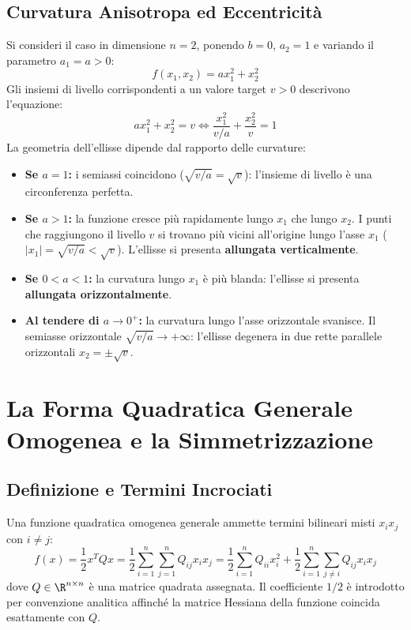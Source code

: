 \subsection{Curvatura Anisotropa ed Eccentricit\`a}
Si consideri il caso in dimensione $n = 2$, ponendo $b = 0$, $a_2 = 1$ e variando il parametro $a_1 = a > 0$:
\begin{equation}
f(x_1, x_2) = a x_1^2 + x_2^2
\end{equation}
Gli insiemi di livello corrispondenti a un valore target $v > 0$ descrivono l'equazione:
\begin{equation}
a x_1^2 + x_2^2 = v \iff \frac{x_1^2}{v/a} + \frac{x_2^2}{v} = 1
\end{equation}
La geometria dell'ellisse dipende dal rapporto delle curvature:
\begin{itemize}
    \item \textbf{Se $a = 1$:} i semiassi coincidono ($\sqrt{v/a} = \sqrt{v}$): l'insieme di livello \`e una circonferenza perfetta.
    \item \textbf{Se $a > 1$:} la funzione cresce pi\`u rapidamente lungo $x_1$ che lungo $x_2$. I punti che raggiungono il livello $v$ si trovano pi\`u vicini all'origine lungo l'asse $x_1$ ($|x_1| = \sqrt{v/a} < \sqrt{v}$). L'ellisse si presenta \textbf{allungata verticalmente}.
    \item \textbf{Se $0 < a < 1$:} la curvatura lungo $x_1$ \`e pi\`u blanda: l'ellisse si presenta \textbf{allungata orizzontalmente}.
    \item \textbf{Al tendere di $a \to 0^+$:} la curvatura lungo l'asse orizzontale svanisce. Il semiasse orizzontale $\sqrt{v/a} \to +\infty$: l'ellisse degenera in due rette parallele orizzontali $x_2 = \pm \sqrt{v}$.
\end{itemize}


\FloatBarrier
\section{La Forma Quadratica Generale Omogenea e la Simmetrizzazione}
\label{sec:opt-forma-quadratica-generale-simmetrizzazione}

\subsection{Definizione e Termini Incrociati}
Una funzione quadratica omogenea generale ammette termini bilineari misti $x_i x_j$ con $i \neq j$:
\begin{equation}
f(x) = \frac{1}{2} x^T Q x = \frac{1}{2} \sum_{i=1}^n \sum_{j=1}^n Q_{ij} x_i x_j = \frac{1}{2} \sum_{i=1}^n Q_{ii} x_i^2 + \frac{1}{2} \sum_{i=1}^n \sum_{j \neq i} Q_{ij} x_i x_j
\end{equation}
dove $Q \in \R^{n \times n}$ \`e una matrice quadrata assegnata. Il coefficiente $1/2$ \`e introdotto per convenzione analitica affinch\'e la matrice Hessiana della funzione coincida esattamente con $Q$.

